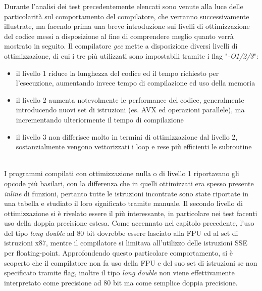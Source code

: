 \documentclass[Lau, oneside]{sapthesis}%
\begin{document}
\newpage
Durante l'analisi dei test precedentemente elencati sono venute alla luce delle particolarità sul comportamento del compilatore, che verranno successivamente illustrate, ma facendo prima una breve introduzione sui livelli di ottimizzazione del codice messi a disposizione al fine di comprendere meglio quanto verrà mostrato in seguito.
\newline \newline
Il compilatore \textit{gcc} mette a disposizione diversi livelli di ottimizzazione, di cui i tre più utilizzati sono impostabili tramite i flag "\textit{-O1/2/3}":
\begin{itemize}
    \item il livello 1 riduce la lunghezza del codice ed il tempo richiesto per l'esecuzione, aumentando invece tempo di compilazione ed uso della memoria
    \item il livello 2 aumenta notevolmente le performance del codice, generalmente introducendo nuovi set di istruzioni (es. AVX ed operazioni parallele), ma incrementando ulteriormente il tempo di compilazione
    \item il livello 3 non differisce molto in termini di ottimizzazione dal livello 2, sostanzialmente vengono vettorizzati i loop e rese più efficienti le subroutine
\end{itemize}
\ \\
I programmi compilati con ottimizzazione nulla o di livello 1 riportavano gli opcode più basilari, con la differenza che in quelli ottimizzati era spesso presente \textit{inline} di funzioni, pertanto tutte le istruzioni incontrate sono state riportate in una tabella e studiato il loro significato tramite manuale.
\newline \newline
Il secondo livello di ottimizzazione si è rivelato essere il più interessante, in particolare nei test facenti uso della doppia precisione estesa.
\newline
Come accennato nel capitolo precedente, l'uso del tipo \textit{long double} ad 80 bit dovrebbe essere lasciato alla FPU ed al set di istruzioni x87, mentre il compilatore si limitava all'utilizzo delle istruzioni SSE per floating-point.
\newline
Approfondendo questo particolare comportamento, si è scoperto che il compilatore non fa uso della FPU e del suo set di istruzioni se non specificato tramite flag, inoltre il tipo \textit{long double} non viene effettivamente interpretato come precisione ad 80 bit ma come semplice doppia precisione.
\end{document}
